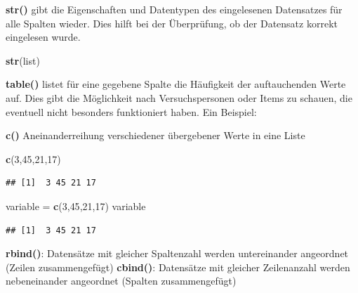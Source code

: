 \documentclass[]{book}
\newenvironment{Shaded}{\begin{snugshade}}{\end{snugshade}}
\newcommand{\KeywordTok}[1]{\textcolor[rgb]{0.13,0.29,0.53}{\textbf{#1}}}
\newcommand{\DecValTok}[1]{\textcolor[rgb]{0.00,0.00,0.81}{#1}}
\newcommand{\StringTok}[1]{\textcolor[rgb]{0.31,0.60,0.02}{#1}}
\newcommand{\OperatorTok}[1]{\textcolor[rgb]{0.81,0.36,0.00}{\textbf{#1}}}
\newcommand{\NormalTok}[1]{#1}
\begin{document}
\textbf{str()} gibt die Eigenschaften und Datentypen des eingelesenen
Datensatzes für alle Spalten wieder. Dies hilft bei der Überprüfung, ob
der Datensatz korrekt eingelesen wurde.

\begin{Shaded}
\begin{Highlighting}[]
\KeywordTok{str}\NormalTok{(list)}
\end{Highlighting}
\end{Shaded}

\textbf{table()} listet für eine gegebene Spalte die Häufigkeit der
auftauchenden Werte auf. Dies gibt die Möglichkeit nach Versuchspersonen
oder Items zu schauen, die eventuell nicht besonders funktioniert haben.
Ein Beispiel:

\begin{Shaded}
\end{Shaded}

\textbf{c()} Aneinanderreihung verschiedener übergebener Werte in eine
Liste

\begin{Shaded}
\begin{Highlighting}[]
\KeywordTok{c}\NormalTok{(}\DecValTok{3}\NormalTok{,}\DecValTok{45}\NormalTok{,}\DecValTok{21}\NormalTok{,}\DecValTok{17}\NormalTok{)}
\end{Highlighting}
\end{Shaded}

\begin{verbatim}
## [1]  3 45 21 17
\end{verbatim}

\begin{Shaded}
\begin{Highlighting}[]
\NormalTok{variable =}\StringTok{ }\KeywordTok{c}\NormalTok{(}\DecValTok{3}\NormalTok{,}\DecValTok{45}\NormalTok{,}\DecValTok{21}\NormalTok{,}\DecValTok{17}\NormalTok{)}
\NormalTok{variable}
\end{Highlighting}
\end{Shaded}

\begin{verbatim}
## [1]  3 45 21 17
\end{verbatim}

\textbf{rbind()}: Datensätze mit gleicher Spaltenzahl werden
untereinander angeordnet (Zeilen zusammengefügt) \textbf{cbind()}:
Datensätze mit gleicher Zeilenanzahl werden nebeneinander angeordnet
(Spalten zusammengefügt)
\end{document}
